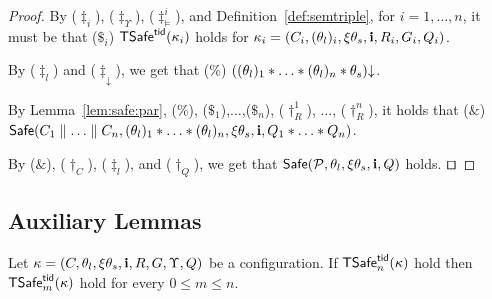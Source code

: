 \begin{proof}
By ($\ddag_i$), ($\ddag_{\Upsilon}$), ($\ddag^i_{\vDash}$), and Definition~\ref{def:semtriple}, 
for $i=1,\ldots,n$, 
it must be that ($\$_i$) ${\sf TSafe}^{{\sf tid}}(\kappa_i)$ holds for $\kappa_i = (C_i,(\theta_l)_i,\xi\theta_s,{\bf i},R_i,G_i,Q_i)$.

By ($\ddag_l$) and ($\ddag_{\downarrow}$), we get that ($\%$)
$((\theta_l)_1 * \ldots* (\theta_l)_n * \theta_s)\mathpunct{\downarrow}$.

By  Lemma~\ref{lem:safe:par}, ($\%$), ($\$_1$),$\ldots$,($\$_n$), ($\dag_R^1$), $\ldots$,  ($\dag_R^n$),
it holds that ($\&$) ${\sf Safe}(C_1 \parallel \ldots \parallel C_n,(\theta_l)_1 * \ldots* (\theta_l)_n, \xi\theta_s,{\bf i},Q_1 * \ldots * Q_n)$.


By ($\&$),  ($\dag_C$), ($\ddag_l$),  and ($\dag_Q$), we get that
${\sf Safe}(\mathcal{P},\theta_l,\xi\theta_s,{\bf i},Q)$ holds. $\qed$
\end{proof}


\subsection{Auxiliary Lemmas} %
\label{sec:auxiliary_lemmas}


\begin{proposition}\label{pro:sound:lesssteps}
Let $\kappa = (C,\theta_l,\xi\theta_s,{\bf i},R,G,\Upsilon, Q)$ be a configuration.
If ${\sf TSafe}^{{\sf tid}}_n(\kappa)$ hold then
${\sf TSafe}^{{\sf tid}}_m(\kappa)$ hold for every $0 \leq m \leq n$.
\end{proposition}


